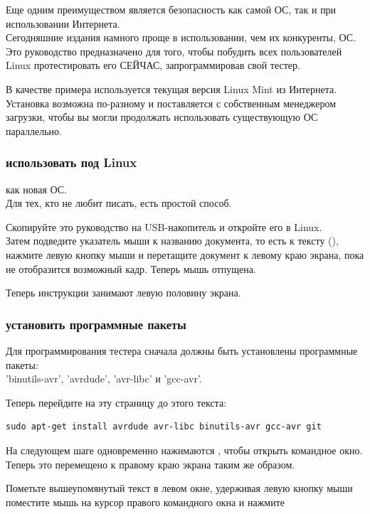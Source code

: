 Еще одним преимуществом является безопасность как самой ОС, так и при использовании Интернета. \\
Сегодняшние издания намного проще в использовании, чем их конкуренты, ОС. \\
Это руководство предназначено для того, чтобы побудить всех  пользователей Linux протестировать его СЕЙЧАС, запрограммировав свой тестер.

В качестве примера используется текущая версия Linux Mint из Интернета.
\\ Установка возможна по-разному и поставляется с собственным менеджером загрузки, чтобы вы могли продолжать использовать существующую ОС параллельно.
\subsubsection{использовать под Linux}
как новая ОС. \\
Для тех, кто не любит писать, есть простой способ.

Скопируйте это руководство на USB-накопитель и откройте его в Linux. \\
Затем подведите указатель мыши к названию документа, то есть к тексту (),
нажмите левую кнопку мыши и перетащите документ к левому краю экрана, пока не отобразится возможный кадр.
Теперь мышь отпущена.

Теперь инструкции занимают левую половину экрана.
\subsubsection{установить программные пакеты}
Для программирования тестера сначала должны быть установлены программные пакеты: \\
'binutils-avr', 'avrdude', 'avr-libc' и 'gcc-avr'.

Теперь перейдите на эту страницу до этого текста:

\begin{large} \vspace{-0.4em} \begin{verbatim}
sudo apt-get install avrdude avr-libc binutils-avr gcc-avr git
\end{verbatim} \end{large}
На следующем шаге одновременно нажимаются , чтобы открыть командное окно.
Теперь это перемещено к правому краю экрана таким же образом.

Пометьте вышеупомянутый текст в левом окне, удерживая левую кнопку мыши
\\ поместите мышь на курсор правого командного окна и нажмите

